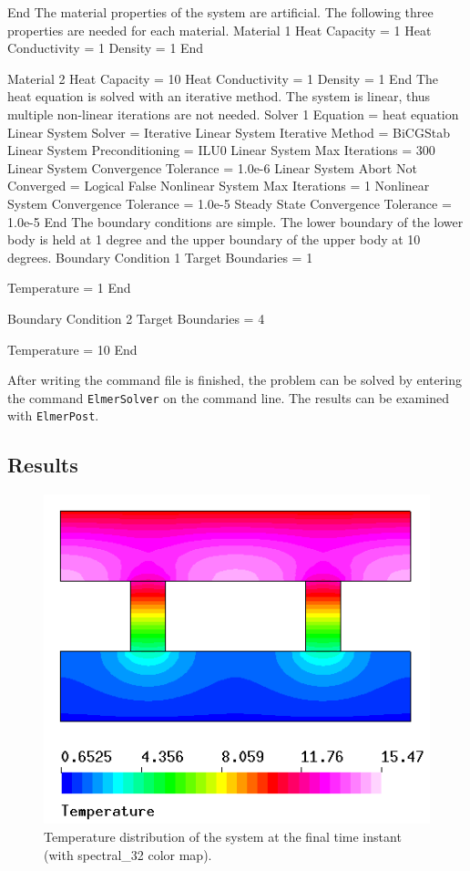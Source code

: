 End
\ttend
%
The material properties of the system are artificial. The following
three properties are needed for each material.
%
\ttbegin
Material 1
  Heat Capacity = 1
  Heat Conductivity = 1
  Density = 1
End

Material 2
  Heat Capacity = 10
  Heat Conductivity = 1
  Density = 1
End
\ttend
%
The heat equation is solved with an iterative method. The system is
linear, thus multiple non-linear iterations are not needed.
%
\ttbegin
Solver 1
  Equation = heat equation
  Linear System Solver = Iterative
  Linear System Iterative Method = BiCGStab
  Linear System Preconditioning = ILU0
  Linear System Max Iterations = 300
  Linear System Convergence Tolerance = 1.0e-6
  Linear System Abort Not Converged = Logical False
  Nonlinear System Max Iterations = 1
  Nonlinear System Convergence Tolerance = 1.0e-5
  Steady State Convergence Tolerance = 1.0e-5
End
\ttend
%
The boundary conditions are simple. The lower boundary of the lower
body is held at 1 degree and the upper boundary of the upper body at
10 degrees.
%
\ttbegin
Boundary Condition 1
  Target Boundaries = 1

  Temperature = 1
End

Boundary Condition 2
  Target Boundaries = 4

  Temperature = 10
End
\ttend

After writing the command file is finished, the problem can be solved
by entering the command \texttt{ElmerSolver} on the command line. The
results can be examined with \texttt{ElmerPost}.


\subsection*{Results}

\begin{figure}
\begin{center}
  \includegraphics[height=0.5\textwidth]{heat.png}
\end{center}
\caption{Temperature distribution of the system at the final time
  instant (with spectral\_32 color map).}
\label{fig:temp_passive}
\end{figure}
 
